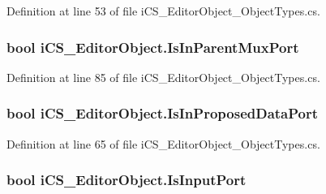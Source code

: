 Definition at line 53 of file i\+C\+S\+\_\+\+Editor\+Object\+\_\+\+Object\+Types.\+cs.

\hypertarget{classi_c_s___editor_object_a41f6753ecda44f9d7c19e38be755954f}{
\subsubsection[{Is\+In\+Parent\+Mux\+Port}]{\setlength{\rightskip}{0pt plus 5cm}bool i\+C\+S\+\_\+\+Editor\+Object.\+Is\+In\+Parent\+Mux\+Port\hspace{0.3cm}{\ttfamily [get]}}}\label{classi_c_s___editor_object_a41f6753ecda44f9d7c19e38be755954f}


Definition at line 85 of file i\+C\+S\+\_\+\+Editor\+Object\+\_\+\+Object\+Types.\+cs.

\hypertarget{classi_c_s___editor_object_a395d6623a81eff85aa4ce84de36faace}{
\subsubsection[{Is\+In\+Proposed\+Data\+Port}]{\setlength{\rightskip}{0pt plus 5cm}bool i\+C\+S\+\_\+\+Editor\+Object.\+Is\+In\+Proposed\+Data\+Port\hspace{0.3cm}{\ttfamily [get]}}}\label{classi_c_s___editor_object_a395d6623a81eff85aa4ce84de36faace}


Definition at line 65 of file i\+C\+S\+\_\+\+Editor\+Object\+\_\+\+Object\+Types.\+cs.

\hypertarget{classi_c_s___editor_object_a418ff6c8ee1fb9fc0a0eb7e8c24dced7}{
\subsubsection[{Is\+Input\+Port}]{\setlength{\rightskip}{0pt plus 5cm}bool i\+C\+S\+\_\+\+Editor\+Object.\+Is\+Input\+Port\hspace{0.3cm}{\ttfamily [get]}}}\label{classi_c_s___editor_object_a418ff6c8ee1fb9fc0a0eb7e8c24dced7}


